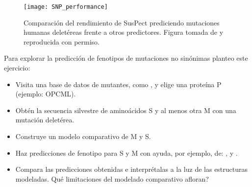 \begin{figure}
\begin{center} 
\texttt{[image: SNP\_performance]}
\caption%
{
Comparaci\'{o}n del rendimiento de SusPect prediciendo mutaciones humanas delet\'{e}reas frente a otros predictores.
Figura tomada de \citep{Yates2014} y reproducida con permiso.
}
\label{fig:SNP_performance} %
\end{center}
\end{figure}

Para explorar la predicci\'{o}n de fenotipos de mutaciones no sin\'{o}nimas planteo este ejercicio:
\begin{itemize}

\item Visita una base de datos de mutantes, como , y elige una prote\'{i}na P (ejemplo: OPCML).

\item Obt\'{e}n la secuencia silvestre de amino\'{a}cidos S y al menos otra M con una mutaci\'{o}n delet\'{e}rea.

\item Construye un modelo comparativo de M y S.

\item Haz predicciones de fenotipo para S y M con ayuda, por ejemplo, de: , 
 y 
.

\item Compara las predicciones obtenidas e interpr\'{e}talas a la luz de las estructuras modeladas. 
Qu\'{e} limitaciones del modelado comparativo afloran?

\end{itemize}
